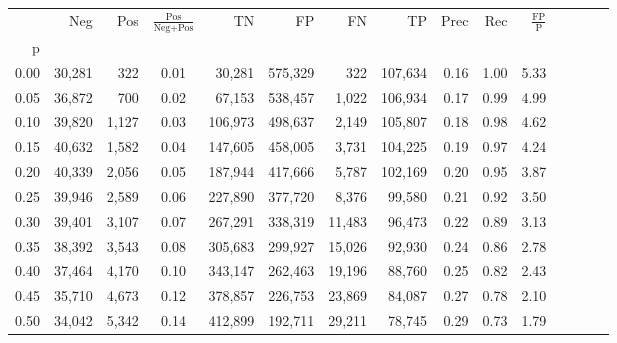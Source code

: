 \begin{tabular}{rrrcrrrrrrrrrrr}
\toprule
{} &     Neg &     Pos & $\frac{\text{Pos}}{\text{Neg}+\text{Pos}}$ &       TN &       FP &       FN &       TP &  Prec &   Rec & $\frac{\text{FP}}{\text{P}}$ \\
p    &         &         &                                            &          &          &          &          &       &       &                              \\
\midrule
0.00 &  30,281 &     322 &                                       0.01 &   30,281 &  575,329 &      322 &  107,634 &  0.16 &  1.00 &                         5.33 \\
0.05 &  36,872 &     700 &                                       0.02 &   67,153 &  538,457 &    1,022 &  106,934 &  0.17 &  0.99 &                         4.99 \\
0.10 &  39,820 &   1,127 &                                       0.03 &  106,973 &  498,637 &    2,149 &  105,807 &  0.18 &  0.98 &                         4.62 \\
0.15 &  40,632 &   1,582 &                                       0.04 &  147,605 &  458,005 &    3,731 &  104,225 &  0.19 &  0.97 &                         4.24 \\
0.20 &  40,339 &   2,056 &                                       0.05 &  187,944 &  417,666 &    5,787 &  102,169 &  0.20 &  0.95 &                         3.87 \\
0.25 &  39,946 &   2,589 &                                       0.06 &  227,890 &  377,720 &    8,376 &   99,580 &  0.21 &  0.92 &                         3.50 \\
0.30 &  39,401 &   3,107 &                                       0.07 &  267,291 &  338,319 &   11,483 &   96,473 &  0.22 &  0.89 &                         3.13 \\
0.35 &  38,392 &   3,543 &                                       0.08 &  305,683 &  299,927 &   15,026 &   92,930 &  0.24 &  0.86 &                         2.78 \\
0.40 &  37,464 &   4,170 &                                       0.10 &  343,147 &  262,463 &   19,196 &   88,760 &  0.25 &  0.82 &                         2.43 \\
0.45 &  35,710 &   4,673 &                                       0.12 &  378,857 &  226,753 &   23,869 &   84,087 &  0.27 &  0.78 &                         2.10 \\
0.50 &  34,042 &   5,342 &                                       0.14 &  412,899 &  192,711 &   29,211 &   78,745 &  0.29 &  0.73 &                         1.79 \\

\end{tabular}

